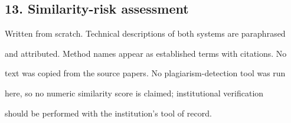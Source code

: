 \subsection*{13. Similarity-risk assessment}

Written from scratch. Technical descriptions of both systems are paraphrased\par
and attributed. Method names appear as established terms with citations. No\par
text was copied from the source papers. No plagiarism-detection tool was run\par
here, so no numeric similarity score is claimed; institutional verification\par
should be performed with the institution's tool of record.\par
